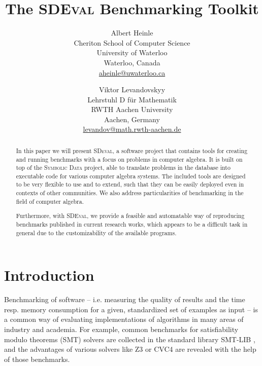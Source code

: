 \documentclass[12pt]{article}
\begin{document}
\title{The \textsc{SDEval} Benchmarking Toolkit}

\author{Albert Heinle\\
Cheriton School of Computer Science\\ University of
Waterloo\\ Waterloo, Canada\\\url{aheinle@uwaterloo.ca} \and Viktor Levandovskyy\\
Lehrstuhl D f\"ur Mathematik\\ RWTH
 Aachen University\\ Aachen, Germany\\
\url{levandov@math.rwth-aachen.de}}


\maketitle

\begin{abstract}
  In this paper we will present \textsc{SDeval}, a software project that
  contains tools for creating and running benchmarks with a focus on problems
  in computer algebra. It is built on top of the \textsc{Symbolic Data}
  project, able to translate problems in the database into executable code for
  various computer algebra systems. The included tools are designed to be very
  flexible to use and to extend, such that they can be easily deployed even in
  contexts of other communities. We also address particularities of
  benchmarking in the field of computer algebra.

Furthermore, with \textsc{SDEval}, we provide a feasible and automatable way of
reproducing benchmarks published in current research works, which appears to be
a difficult task in general due to the customizability of the available
programs.

\end{abstract}


\section{Introduction}

Benchmarking of software -- i.e. measuring the quality of results and the time
resp. memory consumption for a given, standardized set of examples as input --
is a common way of evaluating implementations of algorithms in many areas of
industry and academia. For example, common benchmarks for satisfiability modulo
theorems (SMT) solvers are collected in the standard library \textsc{SMT-LIB}
\cite{barrett2010smt}, and the advantages of various solvers like \textsc{Z3}
\cite{de2008z3} or \textsc{CVC4} \cite{barrett2011cvc4} are revealed with the
help of those benchmarks.
\end{document}
